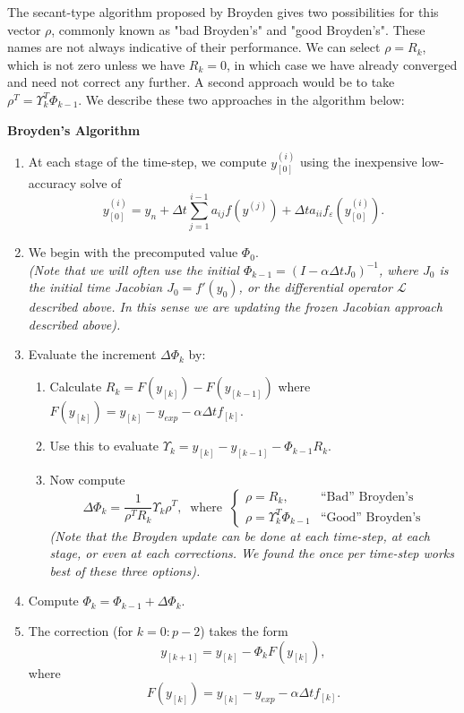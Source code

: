 \documentclass{siamart251104}
\newcommand{\dt}{\Delta t}
\begin{document}
The secant-type algorithm proposed by Broyden gives
two possibilities for this vector $\rho$, commonly known as "bad Broyden's" and "good Broyden's". These names are not always indicative of their performance. 
We can select $\rho = R_k$, which is not zero
unless we have $R_k =0$, in which case we have already converged
and need not correct any further.
A second approach would be to take $\rho^T = \Upsilon_k^T \Phi_{k-1}$.
We describe these two approaches in the algorithm below:
\begin{framed}
    {\bf Broyden's Algorithm}
\begin{enumerate}
    \item At each stage of the time-step, we compute
    $y^{(i)}_{[0]}$ using the inexpensive low-accuracy
    solve of
    \[ y^{(i)}_{[0]} = y_n + \dt \sum_{j=1}^{i-1} a_{ij} f(y^{(j)})
    + \dt a_{ii} f_\varepsilon ( y^{(i)}_{[0]}) . \]
    \item We begin with the precomputed value 
    $\Phi_{0}$. \\
    {\em (Note that we will often use the initial 
    $\Phi_{k-1} = (I-\alpha \dt J_0)^{-1}$, 
    where $J_0$ is the initial time Jacobian 
    $J_0 = f'(y_0)$, or the differential operator $\mathcal{L}$
    described above. In this sense we are updating the 
    frozen Jacobian approach described above).}
    \item  Evaluate the increment $\Delta \Phi_k$ by:
    \begin{enumerate}
        \item Calculate 
        $ R_k =   F(y_{[k]}) - F(y_{[k-1]})$ 
        where $ F(y_{[k]}) = y_{[k]} - y_{exp} - \alpha \dt  f_{[k]}   . $
        \item Use this to evaluate
        $\Upsilon_k =   y_{[k]} - y_{[k-1]} -  \Phi_{k-1} R_k  .     $
        \item Now compute 
        \[\Delta \Phi_k = \frac{1}{\rho^T R_k} \Upsilon_k \rho^T,
        \; \;  \mbox{where} \; \; 
        \left\{ 
        \begin{array}{ll}
        \rho = R_k, &  \mbox{``Bad'' Broyden's}  \\
         \rho = \Upsilon_k^T \Phi_{k-1} &   \mbox{``Good'' Broyden's}
         \end{array}  \right. 
         \]    
       { \em (Note that the Broyden update can be done at each time-step, at each stage, or even at each corrections. We found the once per time-step works best of these three options).}
    \end{enumerate}
    \item Compute $\Phi_k = \Phi_{k-1} + \Delta \Phi_k$.
   \item The correction (for $k=0:p-2$) takes the form
    \[ y_{[k+1]} = y_{[k]}  -   \Phi_k  F(y_{[k]}) ,\]
    where \[ F(y_{[k]}) = y_{[k]} - y_{exp} -   \alpha \dt  f_{[k]}   . \]
\end{enumerate}
\end{framed}
\end{document}
